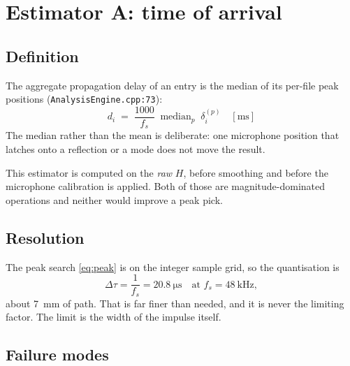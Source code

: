 \documentclass[11pt,a4paper]{article}
\newcommand{\srcref}[2]{\texttt{\small #1}\discretionary{}{}{}\texttt{\small :#2}}
\begin{document}
\section{Estimator A: time of arrival}
\label{sec:A}

\subsection{Definition}

The aggregate propagation delay of an entry is the median of its per-file
peak positions (\srcref{AnalysisEngine.cpp}{73}):
%
\begin{equation}
  \boxed{\;
  d_i \;=\; \frac{1000}{f_s}\;\operatorname{median}_{p}\;\delta_i^{(p)}
  \quad [\mathrm{ms}]\;}
  \label{eq:estA}
\end{equation}
%
The median rather than the mean is deliberate: one microphone position that
latches onto a reflection or a mode does not move the result.

This estimator is computed on the \emph{raw} $H$, before smoothing and before
the microphone calibration is applied. Both of those are magnitude-dominated
operations and neither would improve a peak pick.

\subsection{Resolution}

The peak search \eqref{eq:peak} is on the integer sample grid, so the
quantisation is
%
\begin{equation}
  \Delta \tau = \frac{1}{f_s} = \SI{20.8}{\micro\second}
  \quad\text{at } f_s = \SI{48}{\kilo\hertz},
\end{equation}
%
about \SI{7}{\milli\metre} of path. That is far finer than needed, and it is
never the limiting factor. The limit is the width of the impulse itself.

\subsection{Failure modes}
\label{sec:A-failure}
\end{document}
